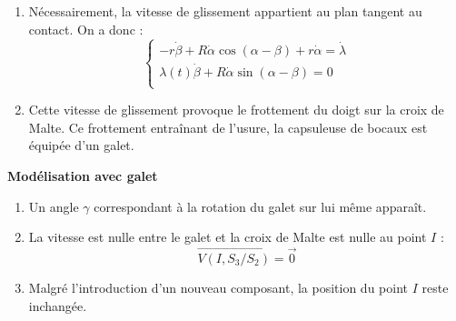 {\begin{enumerate}

$$ \overrightarrow{x_1} 
=\cos(\alpha-\beta)\overrightarrow{x_2} + \sin(\alpha-\beta)\overrightarrow{y_2}
$$
D'où :
$$
\overrightarrow{V(I,S_2/S_1)} =
 \lambda(t) \dot{\beta}\overrightarrow{y_2} - r\dot{\beta}\overrightarrow{x_2} +
 R\dot{\alpha}\cos(\alpha-\beta)\overrightarrow{x_2} +  R\dot{\alpha}\sin(\alpha-\beta)\overrightarrow{y_2} + r\dot{\alpha}\overrightarrow{x_2}$$
$$
\overrightarrow{V(I,S_2/S_1)} =\left[
\begin{array}{l}
- r\dot{\beta}+ R\dot{\alpha}\cos(\alpha-\beta) + r\dot{\alpha}\\
 \lambda(t) \dot{\beta}+  R\dot{\alpha}\sin(\alpha-\beta)\\
0\\
\end{array}
\right]_{\mathcal{R}_2}
$$
\item Nécessairement, la vitesse de glissement appartient au plan tangent au contact. On a donc :
$$
\left\{
\begin{array}{l}
- r\dot{\beta}+ R\dot{\alpha}\cos(\alpha-\beta)  +r\dot{\alpha} = \dot{\lambda}\\
 \lambda(t) \dot{\beta}+  R\dot{\alpha}\sin(\alpha-\beta)=0\\
\end{array}
\right.
$$
\item Cette vitesse de glissement provoque le frottement du doigt sur la croix de Malte. Ce frottement entraînant de l'usure, la capsuleuse de bocaux est équipée d'un galet.
\end{enumerate}

\vspace{0.5cm}
\textbf{Modélisation avec galet}
\begin{enumerate}
\item Un angle $\gamma$ correspondant à la rotation du galet sur lui même apparaît.
\item La vitesse est nulle entre le galet et la croix de Malte est nulle au point $I$ :
$$ 
\overrightarrow{V(I,S_3/S_2)} = \overrightarrow{0}
$$
\item Malgré l'introduction d'un nouveau composant, la position du point $I$ reste inchangée.


\end{enumerate}}
